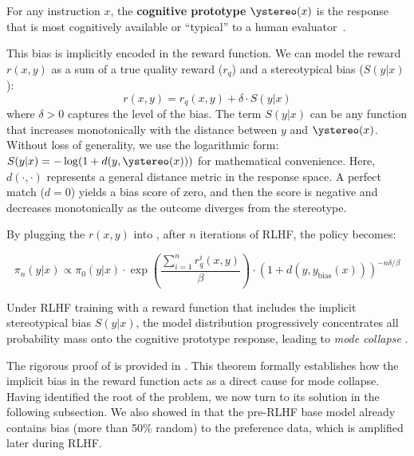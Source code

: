 \begin{definition} For any instruction $x$, the \textbf{cognitive prototype} $\ystereo(x)$ is the response that is most cognitively available or ``typical'' to a human evaluator~\citep{judgement_bias}. \end{definition} This bias is implicitly encoded in the reward function. We can model the reward $r(x,y)$ as a sum of a true quality reward ($r_q$) and a stereotypical bias ($S(y|x)$): 
\begin{equation} r(x,y) = r_{q}(x,y) + \delta \cdot S(y|x) \end{equation} 
where $\delta > 0$ captures the level of the bias. 
 The term $S(y|x)$ can be any function that increases monotonically with the distance between $y$ and $\ystereo(x)$. Without loss of generality, we use the logarithmic form: $S(y|x) = -\log(1 + d(y, \ystereo(x)))$ for mathematical convenience. Here, $d(\cdot,\cdot)$ represents a general distance metric in the response space.  
A perfect match ($d=0$) yields a bias score of zero, and then the score is negative and decreases monotonically as the outcome diverges from the stereotype.

%
By plugging the $r(x,y)$ into , after $n$ iterations of RLHF, the policy becomes: 

\begin{equation} \pi_{n}(y|x) \propto \pi_{0}(y|x) \cdot \exp\left(\frac{\sum_{i=1}^n r_{q}^i(x,y)}{\beta}\right) \cdot (1 + d(y, y_{\text{bias}}(x)))^{-n\delta/\beta} 
\end{equation} 

\begin{theorem}\label{theorem:prototype_convergence} Under RLHF training with a reward function that includes the implicit stereotypical bias $S(y|x)$, the model distribution progressively concentrates all probability mass onto the cognitive prototype response, leading to \emph{mode collapse
}.\end{theorem}
The rigorous proof of  is provided in . This theorem formally establishes how the implicit bias in the reward function acts as a direct cause for mode collapse. Having identified the root of the problem, we now turn to its solution in the following subsection. We also showed in  that the pre-RLHF base model already contains bias (more than 50\% random) to the preference data, which is amplified later during RLHF.

